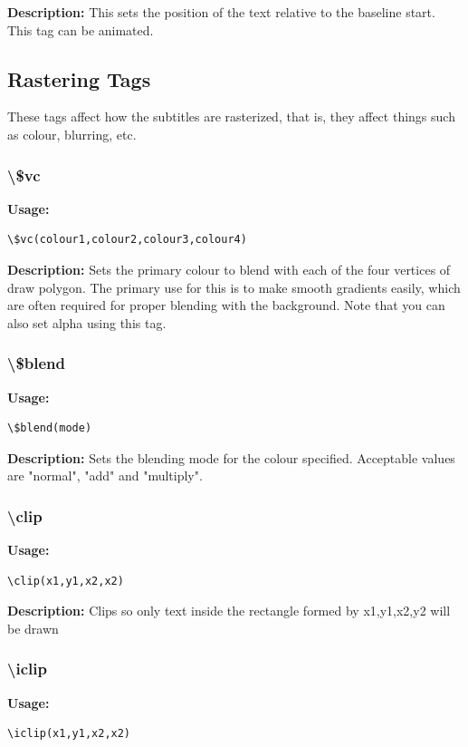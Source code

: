 \documentclass{spec}
\begin{document}
\textbf{Description:}
This sets the position of the text relative to the baseline start. This tag can be animated.

\subsection{Rastering Tags}
These tags affect how the subtitles are rasterized, that is, they affect things such as
colour, blurring, etc.

\subsubsection{\textbackslash \$vc}
\textbf{Usage:}
\begin{verbatim}
\$vc(colour1,colour2,colour3,colour4)
\end{verbatim}

\textbf{Description:}
Sets the primary colour to blend with each of the four vertices of draw polygon.
The primary use for this is to make smooth gradients easily, which are often required
for proper blending with the background. Note that you can also set alpha using this tag.

\subsubsection{\textbackslash \$blend}
\textbf{Usage:}
\begin{verbatim}
\$blend(mode)
\end{verbatim}

\textbf{Description:}
Sets the blending mode for the colour specified. Acceptable values are "normal", "add" and "multiply".

\subsubsection{\textbackslash clip}
\textbf{Usage:}
\begin{verbatim}
\clip(x1,y1,x2,x2)
\end{verbatim}

\textbf{Description:}
Clips so only text inside the rectangle formed by x1,y1,x2,y2 will be drawn

\subsubsection{\textbackslash iclip}
\textbf{Usage:}
\begin{verbatim}
\iclip(x1,y1,x2,x2)
\end{verbatim}
\end{document}
